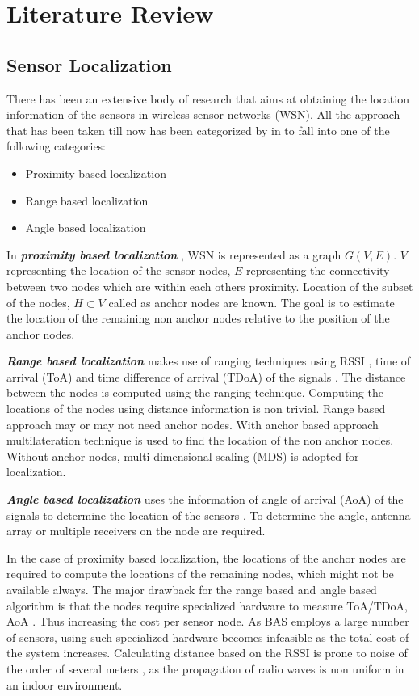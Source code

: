 \chapter{Literature Review}
\label{chp:litReview}
\section{Sensor Localization}
There has been an extensive body of research that aims at obtaining the location information of the sensors in wireless sensor networks (WSN). All the approach that has been taken till now has been categorized by \citeauthor{wang2010survey} in \cite{wang2010survey} to fall into one of the following categories:
\begin{itemize}
\item Proximity based localization
\item Range based localization
\item Angle based localization
\end{itemize}

In \textbf{\textit{proximity based localization}} \cite{bulusu2000gps,4317866,shang2003localization}, WSN is represented as a graph $G(V,E)$. $V$ representing the location of the sensor nodes, $E$ representing the connectivity between two nodes which are within each others proximity. Location of the  subset of the nodes, $H \subset V$ called as anchor nodes are known. The goal is to estimate the location of the remaining non anchor nodes relative to the position of the anchor nodes. 

\textbf{\textit{Range based localization}} makes use of  ranging techniques using RSSI \cite{mao2007path}, time of arrival (ToA) \cite{moses2003self} and time difference of arrival (TDoA) of the signals \cite{4058681}. The distance between the nodes is computed using the ranging technique. Computing the locations of the nodes using distance information is non trivial. Range based approach may or may not need anchor nodes. With anchor based approach multilateration technique is used to find the location of the non anchor nodes. Without anchor nodes, multi dimensional scaling (MDS) is adopted for localization. 

\textbf{\textit{Angle based  localization}} uses the information of angle of arrival (AoA) of the signals to determine the location of the sensors \cite{nasipuri2002directionality,rong2006angle}. To determine the angle, antenna array or multiple receivers on the node are required.

In the case of proximity based localization, the locations of the anchor nodes are required to compute the locations of the remaining nodes, which might not be available always. The major drawback for the range based and angle based algorithm is that the nodes require specialized hardware to measure ToA/TDoA, AoA \cite{4317866}. Thus increasing the cost per sensor node. As BAS employs a large number of sensors, using such specialized hardware becomes infeasible as the total cost of the system increases. Calculating distance based on the RSSI is prone to noise of the order of several meters \cite{bachrach2005localization}, as the propagation of radio waves is non uniform in an indoor environment.

